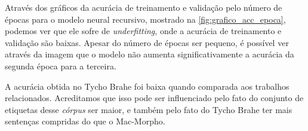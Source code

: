 Através dos gráficos da acurácia de treinamento e validação pelo número de épocas para o modelo neural recursivo, mostrado na \autoref{fig:grafico_acc_epoca}, podemos ver que ele sofre de \textit{underfitting}, onde a acurácia de treinamento e validação são baixas. Apesar do número de épocas ser pequeno, é possível ver através da imagem que o modelo não aumenta significativamente a acurácia da segunda época para a terceira.

A acurácia obtida no Tycho Brahe foi baixa quando comparada aos trabalhos relacionados. Acreditamos que isso pode ser influenciado pelo fato do conjunto de etiquetas desse \textit{córpus} ser maior, e também pelo fato do Tycho Brahe ter mais sentenças compridas do que o Mac-Morpho. 




